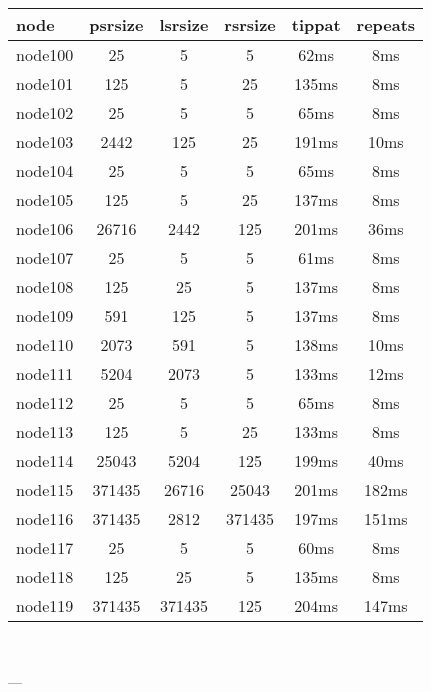 \begin{tabular}{|l|c|c|c|c|c|}
\hline node & psrsize & lsrsize & rsrsize   & tippat & repeats\\
    \hline node100 & 25 & 5 & 5 & 62ms & 8ms\\
    \hline node101 & 125 & 5 & 25 & 135ms & 8ms\\
    \hline node102 & 25 & 5 & 5 & 65ms & 8ms\\
    \hline node103 & 2442 & 125 & 25 & 191ms & 10ms\\
    \hline node104 & 25 & 5 & 5 & 65ms & 8ms\\
    \hline node105 & 125 & 5 & 25 & 137ms & 8ms\\
    \hline node106 & 26716 & 2442 & 125 & 201ms & 36ms\\
    \hline node107 & 25 & 5 & 5 & 61ms & 8ms\\
    \hline node108 & 125 & 25 & 5 & 137ms & 8ms\\
    \hline node109 & 591 & 125 & 5 & 137ms & 8ms\\
    \hline node110 & 2073 & 591 & 5 & 138ms & 10ms\\
    \hline node111 & 5204 & 2073 & 5 & 133ms & 12ms\\
    \hline node112 & 25 & 5 & 5 & 65ms & 8ms\\
    \hline node113 & 125 & 5 & 25 & 133ms & 8ms\\
    \hline node114 & 25043 & 5204 & 125 & 199ms & 40ms\\
    \hline node115 & 371435 & 26716 & 25043 & 201ms & 182ms\\
    \hline node116 & 371435 & 2812 & 371435 & 197ms & 151ms\\
    \hline node117 & 25 & 5 & 5 & 60ms & 8ms\\
    \hline node118 & 125 & 25 & 5 & 135ms & 8ms\\
    \hline node119 & 371435 & 371435 & 125 & 204ms & 147ms\\

\hline
\end{tabular} \

---


